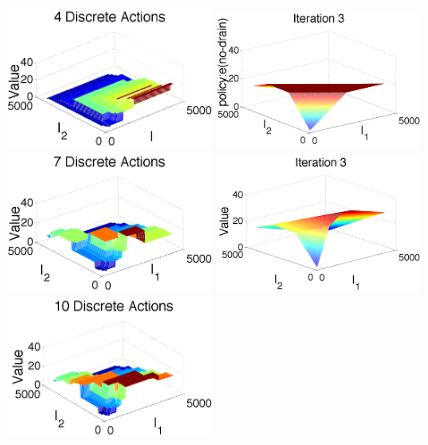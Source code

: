 \documentclass[twoside,11pt]{article}
\begin{document}
\begin{figure}[tbp!]
\centering
\vspace{10mm}
\includegraphics[width=0.48\textwidth]{pics/res3d4.pdf} 
\hspace{2mm}
\includegraphics[width=0.48\textwidth]{pics/q3.pdf}
\vspace{10mm}
\includegraphics[width=0.48\textwidth]{pics/res3d7.pdf}
\hspace{2mm}
\includegraphics[width=0.48\textwidth]{pics/v3.pdf}
\vspace{10mm}
\includegraphics[width=0.48\textwidth]{pics/res3d10.pdf}

\end{figure}
\end{document}
